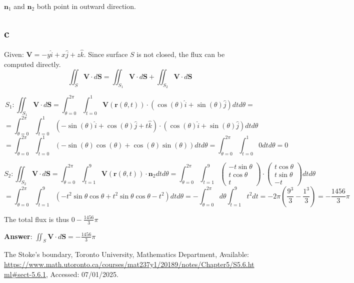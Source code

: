 \documentclass{article}
\begin{document}
$\mathbf{n}_{1}$ and $\mathbf{n}_{2}$ both point in outward direction.

\subsection{c}
Given: $\mathbf{V} = -y\hat{i} + x\hat{j} + z\hat{k}$. Since surface $S$ is not closed, the flux can be computed directly.
\begin{equation*}
  \iint_{S} \mathbf{V} \cdot d\mathbf{S} = \iint_{S_1} \mathbf{V} \cdot d\mathbf{S} + \iint_{S_2} \mathbf{V} \cdot d\mathbf{S}
\end{equation*}

\begin{equation*}
  S_1: \iint_{S_1} \mathbf{V} \cdot d\mathbf{S} =  \int_{\theta=0}^{2\pi} \int_{t=0}^{1} \mathbf{V}(\mathbf{r}(\theta, t)) \cdot (\cos(\theta)\hat{i} + \sin(\theta)\hat{j}) dtd\theta =
\end{equation*}
\begin{equation*}
  = \int_{\theta=0}^{2\pi} \int_{t=0}^{1} ( -\sin(\theta)\hat{i} + \cos(\theta)\hat{j} + t\hat{k})  \cdot (\cos(\theta)\hat{i} + \sin(\theta)\hat{j}) dtd\theta
\end{equation*}
\begin{equation*}
   = \int_{\theta=0}^{2\pi} \int_{t=0}^{1} \left( -\sin(\theta) \cos(\theta) + \cos(\theta) \sin(\theta) \right)  dtd\theta = \int_{\theta=0}^{2\pi} \int_{t=0}^{1} 0dtd\theta = 0
 \end{equation*}

\begin{equation*}
  S_2: \iint_{S_2} \mathbf{V} \cdot d\mathbf{S} = \int_{\theta=0}^{2\pi} \int_{t=1}^{9} \mathbf{V}(\mathbf{r}(\theta, t)) \cdot \mathbf{n}_{2} dtd\theta = \int_{\theta=0}^{2\pi} \int_{t=1}^{9} \begin{pmatrix} -t\sin \theta \\ t\cos \theta \\ t \end{pmatrix} \cdot \begin{pmatrix} t\cos \theta \\ t\sin \theta \\ -t \end{pmatrix} dtd\theta
\end{equation*}
\begin{equation*}
  = \int_{\theta=0}^{2\pi} \int_{t=1}^{9} \left( -t^{2}\sin \theta \cos \theta + t^{2} \sin \theta \cos \theta - t^{2}  \right)  dtd\theta = -\int_{\theta=0}^{2\pi} d\theta \int_{t=1}^{9}t^{2} dt = -2\pi \left( \frac{9^{3}}{3} - \frac{1^{3}}{3}  \right) = -\frac{1456}{3}\pi
\end{equation*}

The total flux is thus $0-\frac{1456}{3}\pi$

\textbf{Answer}: $\iint_S \mathbf{V} \cdot d\mathbf{S} = -\frac{1456}{3}\pi$
\begin{thebibliography}{99}

{The Stoke's boundary}, {Toronto University, Mathematics Department}, Available: \url{https://www.math.utoronto.ca/courses/mat237y1/20189/notes/Chapter5/S5.6.html#sect-5.6.1}, Accessed: 07/01/2025.
  
\end{thebibliography}
\end{document}
